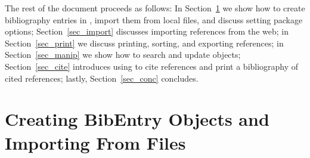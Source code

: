 \documentclass[article]{jss}\usepackage[]{graphicx}\usepackage[]{color}
\newcommand{\ourpkg}{\pkg{RefManageR}}
\begin{document}
The rest of the document proceeds as follows: In Section~\ref{sec_create} we show how to create bibliography entries in \R{}, import them from local files, and discuss setting package options; Section~\ref{sec_import} discusses importing references from the web; in Section~\ref{sec_print} we discuss printing, sorting, and exporting references; in Section~\ref{sec_manip} we show how to search and update  objects; Section~\ref{sec_cite} introduces using \ourpkg{} to cite references and print a bibliography of cited references; lastly, Section~\ref{sec_conc} concludes.
% 
\section{Creating BibEntry Objects and Importing From Files}\label{sec_create}
\end{document}
